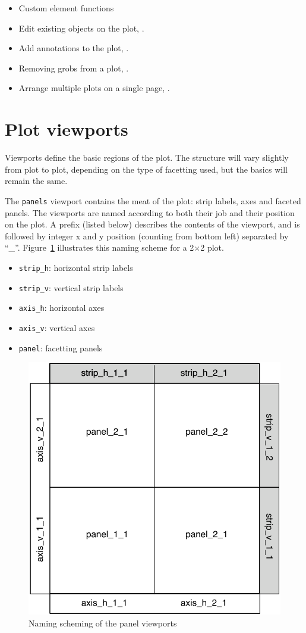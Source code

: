 \begin{itemize}
  \item Custom element functions
  \item Edit existing objects on the plot, .
  \item Add annotations to the plot, .
  \item Removing grobs from a plot, .
  \item Arrange multiple plots on a single page, .
\end{itemize}

\section{Plot viewports}
\label{sec:plot-viewports}

Viewports define the basic regions of the plot.  The structure will vary slightly from plot to plot, depending on the type of facetting used, but the basics will remain the same. 

The {\tt panels} viewport contains the meat of the plot: strip labels, axes and faceted panels.  The viewports are named according to both their job and their position on the plot.  A prefix (listed below) describes the contents of the viewport, and is followed by integer x and y position (counting from bottom left) separated by ``\_''.  Figure~\ref{fig:panelvp} illustrates this naming scheme for a 2$\times$2 plot.

\begin{itemize}
  \item {\tt strip\_h}: horizontal strip labels
  \item {\tt strip\_v}: vertical strip labels
  \item {\tt axis\_h}: horizontal axes
  \item {\tt axis\_v}: vertical axes
  \item {\tt panel}: facetting panels
\end{itemize}

\begin{figure}[htbp]
  \centering
    \includegraphics[width=0.5 \textwidth]{grid-panelvp}
  \caption{Naming scheming of the panel viewports}
  \label{fig:panelvp}
\end{figure}

